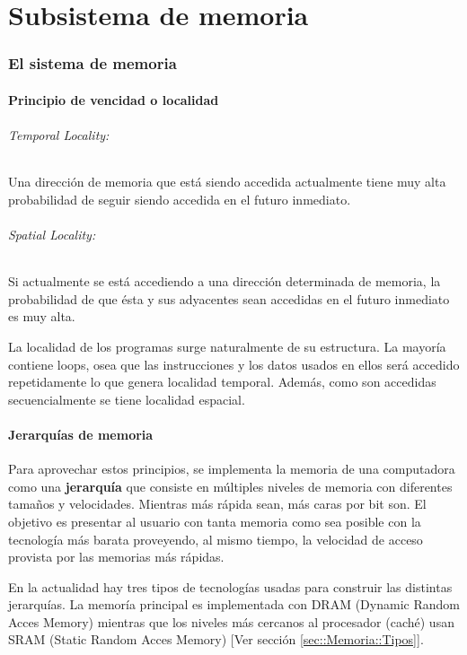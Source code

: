 \part{Subsistema de memoria}
\section{El sistema de memoria}
\subsection{Principio de vencidad o localidad}
\paragraph{Temporal Locality:} Una dirección de memoria que está siendo accedida actualmente tiene muy alta probabilidad de seguir siendo accedida en el futuro inmediato.

\paragraph{Spatial Locality:} Si actualmente se está accediendo a una dirección determinada de memoria, la probabilidad de que ésta y sus adyacentes sean accedidas en el futuro inmediato es muy alta.

La localidad de los programas surge naturalmente de su estructura. La mayoría contiene loops, osea que las instrucciones y los datos usados en ellos será accedido repetidamente lo que genera localidad temporal. Además, como son accedidas secuencialmente se tiene localidad espacial.

\subsection{Jerarquías de memoria}
Para aprovechar estos principios, se implementa la memoria de una computadora como una \textbf{jerarquía} que consiste en múltiples niveles de memoria con diferentes tamaños y velocidades. Mientras más rápida sean, más caras por bit son. El objetivo es presentar al usuario con tanta memoria como sea posible con la tecnología más barata proveyendo, al mismo tiempo, la velocidad de acceso provista por las memorias más rápidas.

En la actualidad hay tres tipos de tecnologías usadas para construir las distintas jerarquías. La memoría principal es implementada con DRAM (Dynamic Random Acces Memory) mientras que los niveles más cercanos al procesador (caché) usan SRAM (Static Random Acces Memory)  [Ver sección \ref{sec::Memoria::Tipos}].

